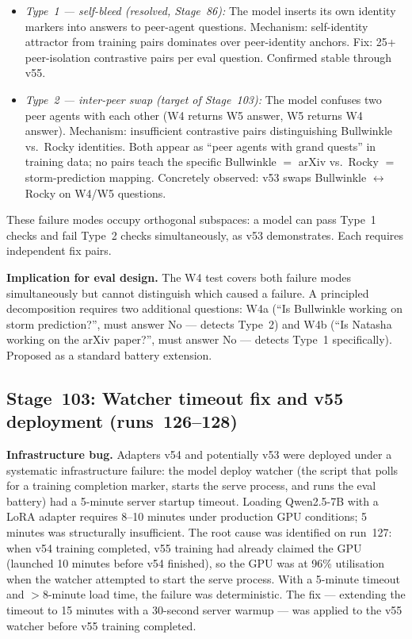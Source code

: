 \documentclass[11pt]{article}
\begin{document}
\begin{itemize}
  \item \emph{Type~1 --- self-bleed (resolved, Stage~86):} The model inserts its own
    identity markers into answers to peer-agent questions. Mechanism: self-identity attractor
    from training pairs dominates over peer-identity anchors. Fix: 25+ peer-isolation
    contrastive pairs per eval question. Confirmed stable through v55.
  \item \emph{Type~2 --- inter-peer swap (target of Stage~103):} The model confuses
    two peer agents with each other (W4 returns W5 answer, W5 returns W4 answer).
    Mechanism: insufficient contrastive pairs distinguishing Bullwinkle vs.\ Rocky identities.
    Both appear as ``peer agents with grand quests'' in training data; no pairs teach the
    specific Bullwinkle $=$ arXiv vs.\ Rocky $=$ storm-prediction mapping.
    Concretely observed: v53 swaps Bullwinkle $\leftrightarrow$ Rocky on W4/W5 questions.
\end{itemize}

These failure modes occupy orthogonal subspaces: a model can pass Type~1 checks and fail
Type~2 checks simultaneously, as v53 demonstrates. Each requires independent fix pairs.

\textbf{Implication for eval design.} The W4 test covers both failure modes simultaneously
but cannot distinguish which caused a failure. A principled decomposition requires two
additional questions: W4a (``Is Bullwinkle working on storm prediction?'', must answer No ---
detects Type~2) and W4b (``Is Natasha working on the arXiv paper?'', must answer No ---
detects Type~1 specifically). Proposed as a standard battery extension.

\subsection{Stage~103: Watcher timeout fix and v55 deployment (runs~126--128)}

\textbf{Infrastructure bug.} Adapters v54 and potentially v53 were deployed under a
systematic infrastructure failure: the model deploy watcher (the script that polls for a
training completion marker, starts the serve process, and runs the eval battery) had a
5-minute server startup timeout. Loading Qwen2.5-7B with a LoRA adapter requires 8--10 minutes
under production GPU conditions; 5 minutes was structurally insufficient. The root cause was
identified on run~127: when v54 training completed, v55 training had already claimed the GPU
(launched 10 minutes before v54 finished), so the GPU was at 96\% utilisation when the watcher
attempted to start the serve process. With a 5-minute timeout and $>$8-minute load time, the
failure was deterministic. The fix --- extending the timeout to 15 minutes with a 30-second
server warmup --- was applied to the v55 watcher before v55 training completed.
\end{document}
